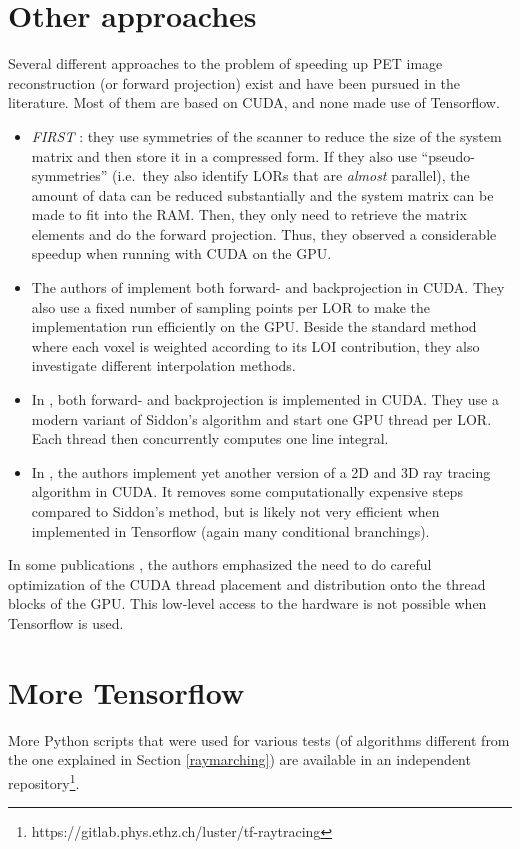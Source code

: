 \documentclass[a4paper, 11pt]{article}
\begin{document}
  \section{Other approaches}
  Several different approaches to the problem of speeding up PET image reconstruction (or forward projection) exist and have been pursued in the literature. Most of them are based on CUDA, and none made use of Tensorflow.
  \begin{itemize}
  \item \textsl{FIRST} \cite{first, first_gpu}: they use symmetries of the scanner to reduce the size of the system matrix and then store it in a compressed form. If they also use ``pseudo-symmetries'' (i.e.~they also identify LORs that are \textsl{almost} parallel), the amount of data can be reduced substantially and the system matrix can be made to fit into the RAM. Then, they only need to retrieve the matrix elements and do the forward projection. Thus, they observed a considerable speedup when running with CUDA on the GPU.
  \item The authors of \cite{plos} implement both forward- and backprojection in CUDA. They also use a fixed number of sampling points per LOR to make the implementation run efficiently on the GPU. Beside the standard method where each voxel is weighted according to its LOI contribution, they also investigate different interpolation methods.
  \item In \cite{gpu_impl_siddon_improved}, both forward- and backprojection is implemented in CUDA. They use a modern variant of Siddon's algorithm \cite{siddon-improved-2} and start one GPU thread per LOR. Each thread then concurrently computes one line integral.
  \item In \cite{fast-xray}, the authors implement yet another version of a 2D and 3D ray tracing algorithm in CUDA. It removes some computationally expensive steps compared to Siddon's method, but is likely not very efficient when implemented in Tensorflow (again many conditional branchings).
  \end{itemize}
  In some publications \cite{thread-opt}, the authors emphasized the need to do careful optimization of the CUDA thread placement and distribution onto the thread blocks of the GPU. This low-level access to the hardware is not possible when Tensorflow is used.

  \section{More Tensorflow}
  \label{more_tf}
  More Python scripts that were used for various tests (of algorithms different from the one explained in Section \ref{raymarching}) are available in an independent repository\footnote{https://gitlab.phys.ethz.ch/luster/tf-raytracing}.
\end{document}
